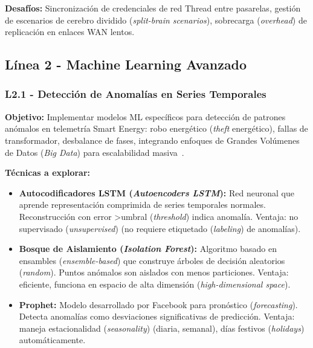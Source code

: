 \textbf{Desafíos:} Sincronización de credenciales de red Thread entre pasarelas, gestión de escenarios de cerebro dividido (\textit{split-brain scenarios}), sobrecarga (\textit{overhead}) de replicación en enlaces WAN lentos.

\subsection{Línea 2 - Machine Learning Avanzado}

\subsubsection{L2.1 - Detección de Anomalías en Series Temporales}

\textbf{Objetivo:} Implementar modelos ML específicos para detección de patrones anómalos en telemetría Smart Energy: robo energético (\textit{theft} energético), fallas de transformador, desbalance de fases, integrando enfoques de Grandes Volúmenes de Datos (\textit{Big Data}) para escalabilidad masiva~\cite{chintaEdgeAIRealTime2024,jonnakutiEDGEBASEDFAULTDETECTION,harveSafeguardingIoTBig}.

\textbf{Técnicas a explorar:}
\begin{itemize}
\item \textbf{Autocodificadores LSTM (\textit{Autoencoders LSTM}):} Red neuronal que aprende representación comprimida de series temporales normales. Reconstrucción con error >umbral (\textit{threshold}) indica anomalía. Ventaja: no supervisado (\textit{unsupervised}) (no requiere etiquetado (\textit{labeling}) de anomalías).
\item \textbf{Bosque de Aislamiento (\textit{Isolation Forest}):} Algoritmo basado en ensambles (\textit{ensemble-based}) que construye árboles de decisión aleatorios (\textit{random}). Puntos anómalos son aislados con menos particiones. Ventaja: eficiente, funciona en espacio de alta dimensión (\textit{high-dimensional space}).
\item \textbf{Prophet:} Modelo desarrollado por Facebook para pronóstico (\textit{forecasting}). Detecta anomalías como desviaciones significativas de predicción. Ventaja: maneja estacionalidad (\textit{seasonality}) (diaria, semanal), días festivos (\textit{holidays}) automáticamente.
\end{itemize}

